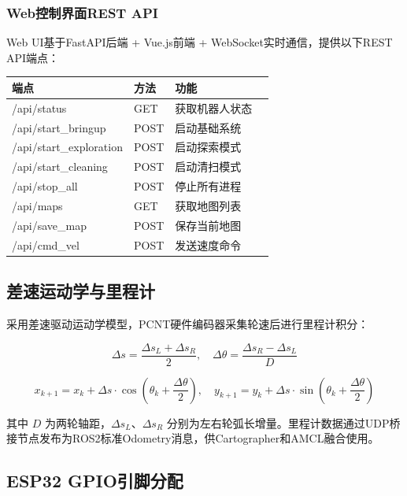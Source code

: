 \documentclass[12pt,a4paper]{ctexart}
\begin{document}
\subsubsection{Web控制界面REST API}

Web UI基于FastAPI后端 + Vue.js前端 + WebSocket实时通信，提供以下REST API端点：

\begin{center}
\begin{tabular}{llll}
\toprule
\textbf{端点} & \textbf{方法} & \textbf{功能} \\
\midrule
/api/status          & GET  & 获取机器人状态 \\
/api/start\_bringup   & POST & 启动基础系统 \\
/api/start\_exploration & POST & 启动探索模式 \\
/api/start\_cleaning  & POST & 启动清扫模式 \\
/api/stop\_all        & POST & 停止所有进程 \\
/api/maps            & GET  & 获取地图列表 \\
/api/save\_map        & POST & 保存当前地图 \\
/api/cmd\_vel         & POST & 发送速度命令 \\
\bottomrule
\end{tabular}
\end{center}

\subsection{差速运动学与里程计}

采用差速驱动运动学模型，PCNT硬件编码器采集轮速后进行里程计积分：

\begin{equation}
    \Delta s = \frac{\Delta s_L + \Delta s_R}{2}, \quad
    \Delta\theta = \frac{\Delta s_R - \Delta s_L}{D}
\end{equation}

\begin{equation}
    x_{k+1} = x_k + \Delta s \cdot \cos\!\left(\theta_k + \frac{\Delta\theta}{2}\right), \quad
    y_{k+1} = y_k + \Delta s \cdot \sin\!\left(\theta_k + \frac{\Delta\theta}{2}\right)
\end{equation}

其中 $D$ 为两轮轴距，$\Delta s_L$、$\Delta s_R$ 分别为左右轮弧长增量。里程计数据通过UDP桥接节点发布为ROS2标准Odometry消息，供Cartographer和AMCL融合使用。

\subsection{ESP32 GPIO引脚分配}
\end{document}
